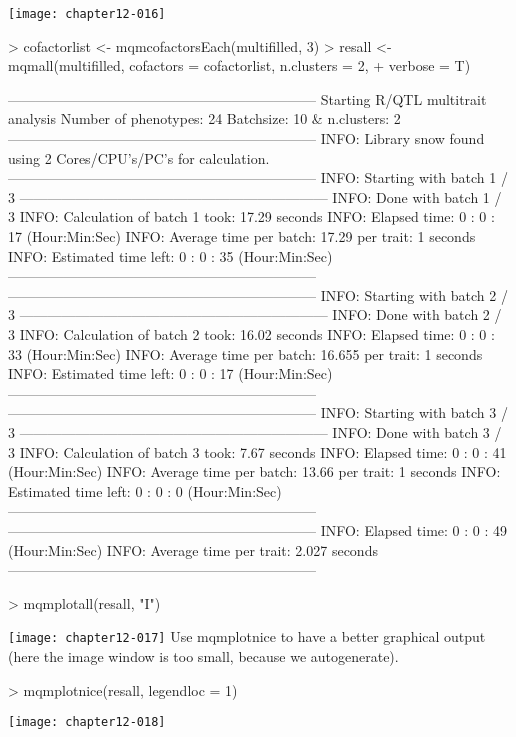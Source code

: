 \documentclass[a4paper]{article}
\begin{document}
\texttt{[image: chapter12-016]}
\begin{Schunk}
\begin{Sinput}
> cofactorlist <- mqmcofactorsEach(multifilled, 3)
> resall <- mqmall(multifilled, cofactors = cofactorlist, n.clusters = 2, 
+     verbose = T)
\end{Sinput}
\begin{Soutput}
------------------------------------------------------------------
Starting R/QTL multitrait analysis
Number of phenotypes: 24 
Batchsize: 10  & n.clusters: 2 
------------------------------------------------------------------
INFO: Library snow found using  2  Cores/CPU's/PC's for calculation.
------------------------------------------------------------------
INFO: Starting with batch 1 / 3 
------------------------------------------------------------------
INFO: Done with batch 1 / 3 
INFO: Calculation of batch 1 took: 17.29 seconds
INFO: Elapsed time: 0 : 0 : 17 (Hour:Min:Sec)
INFO: Average time per batch: 17.29  per trait: 1 seconds
INFO: Estimated time left: 0 : 0 : 35 (Hour:Min:Sec)
------------------------------------------------------------------
------------------------------------------------------------------
INFO: Starting with batch 2 / 3 
------------------------------------------------------------------
INFO: Done with batch 2 / 3 
INFO: Calculation of batch 2 took: 16.02 seconds
INFO: Elapsed time: 0 : 0 : 33 (Hour:Min:Sec)
INFO: Average time per batch: 16.655  per trait: 1 seconds
INFO: Estimated time left: 0 : 0 : 17 (Hour:Min:Sec)
------------------------------------------------------------------
------------------------------------------------------------------
INFO: Starting with batch 3 / 3 
------------------------------------------------------------------
INFO: Done with batch 3 / 3 
INFO: Calculation of batch 3 took: 7.67 seconds
INFO: Elapsed time: 0 : 0 : 41 (Hour:Min:Sec)
INFO: Average time per batch: 13.66  per trait: 1 seconds
INFO: Estimated time left: 0 : 0 : 0 (Hour:Min:Sec)
------------------------------------------------------------------
------------------------------------------------------------------
INFO: Elapsed time: 0 : 0 : 49 (Hour:Min:Sec)
INFO: Average time per trait: 2.027 seconds
------------------------------------------------------------------
\end{Soutput}
\begin{Sinput}
> mqmplotall(resall, "I")
\end{Sinput}
\end{Schunk}
\texttt{[image: chapter12-017]}
Use mqmplotnice to have a better graphical output (here the image window is too small, because we autogenerate).
\begin{Schunk}
\begin{Sinput}
> mqmplotnice(resall, legendloc = 1)
\end{Sinput}
\end{Schunk}
\texttt{[image: chapter12-018]}
\end{document}
